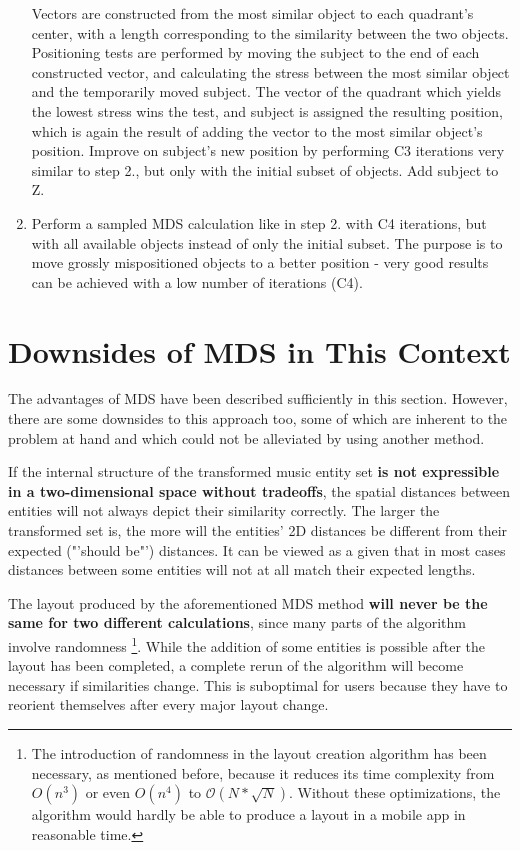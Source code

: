 \begin{enumerate}
			\subsubitem Vectors are constructed from the most similar object to each quadrant's center, with a length corresponding to the similarity between the two objects.
			\subsubitem Positioning tests are performed by moving the subject to the end of each constructed vector, and calculating the stress between the most similar object and the temporarily moved subject. The vector of the quadrant which yields the lowest stress wins the test, and subject is assigned the resulting position, which is again the result of adding the vector to the most similar object's position.
		\subitem Improve on subject's new position by performing C3 iterations very similar to step 2., but only with the initial subset of objects.
		\subitem Add subject to Z.
	\item Perform a sampled MDS calculation like in step 2. with C4 iterations, but with all available objects instead of only the initial subset. The purpose is to move grossly mispositioned objects to a better position - very good results can be achieved with a low number of iterations (C4).
		
\end{enumerate}

\section{Downsides of MDS in This Context}

The advantages of MDS have been described sufficiently in this section. However, there are some downsides to this approach too, some of which are inherent to the problem at hand and which could not be alleviated by using another method.

If the internal structure of the transformed music entity set \textbf{is not expressible in a two-dimensional space without tradeoffs}, the spatial distances between entities will not always depict their similarity correctly. The larger the transformed set is, the more will the entities' 2D distances be different from their expected ("'should be"') distances. It can be viewed as a given that in most cases distances between some entities will not at all match their expected lengths.

The layout produced by the aforementioned MDS method \textbf{will never be the same for two different calculations}, since many parts of the algorithm involve randomness 
\footnote{The introduction of randomness in the layout creation algorithm has been necessary, as mentioned before, because it reduces its time complexity from $O(n^3)$ or even $O(n^4)$ to $\mathcal O(N*\sqrt{N})$. Without these optimizations, the algorithm would hardly be able to produce a layout in a mobile app in reasonable time.}.
While the addition of some entities is possible after the layout has been completed, a complete rerun of the algorithm will become necessary if similarities change. This is suboptimal for users because they have to reorient themselves after every major layout change.

